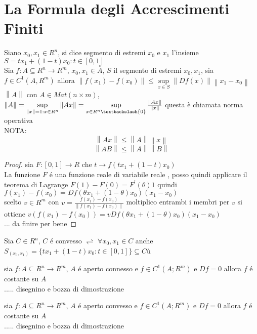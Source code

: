 \section{La Formula degli Accrescimenti Finiti}
Siano $x_0,x_1\in R^n$, si dice segmento di estremi $x_0$ e $x_1$ l'insieme $S={tx_1+(1-t)x_0 : t\in[0,1]}$
\\
Sia $f:A\subseteq R^n\rightarrow R^m$, $x_0,x_1\in\overset{\circ}{A}$, $S$ il segmento di estremi $x_0,x_1$, sia $f\in C^1(A,R^m)$ allora $\left\| f(x_1)-f(x_0) \right\|\le \sup\limits_{x\in S}\left\|Df(x)\right\|\left\|x_1-x_0\right\|$
\observation
$\left\| A \right\|$ con $A\in Mat(n\times m)$,  $\left\| A \right\|=\sup\limits_{\left\| x \right\|=1: x\in R^n}\left\| Ax \right\| = \sup\limits_{x\in R^n \textbackslash \{0\}}\frac{\left\| Ax \right\| }{\left\| x \right\| } $ questa è chiamata norma operativa\\
NOTA:\\
$$\left\| Ax \right\| \le \left\| A \right\| \left\| x \right\|  $$
$$\left\| AB \right\| \le \left\| A \right\| \left\| B \right\|  $$
\begin{proof}
	sia $F:[0,1]\rightarrow R$ che $t\rightarrow f(tx_1+(1-t)x_0)$\\
	La funzione $F$ \'e una funzione reale di variabile reale , posso quindi applicare il teorema di Lagrange $F(1)-F(0)=F^{'}(\theta)1$ quindi $f(x_1)-f(x_0) = Df(\theta x_1 + (1-\theta)x_0)(x_1-x_0)$\\
	scelto $v\in R^m$ con $v = \frac{f(x_1)-f(x_0)}{\left\| f(x_1)-f(x_0)\right\| }$ moltiplico entrambi i membri per $v$ si ottiene $v(f(x_1)-f(x_0)) = vDf(\theta x_1 + (1-\theta)x_0)(x_1-x_0)$\\
	... da finire per bene
\end{proof}
Sia $C\in R^n$, $C$ \'e convesso $\rightleftharpoons$ $\forall x_0,x_1\in C$ anche $S_(x_0,x_1) = \{tx_1+(1-t)x_0 : t\in[0,1]\}\subseteq C$ù

\proposition
sia $f:A\subseteq R^n \rightarrow R^m$, $A$ \'e aperto connesso e $f\in C^1(A;R^m)$ e $Df=0$ allora $f$ \'e costante su $A$\\
..... disegnino e bozza di dimostrazione

\proposition
sia $f:A\subseteq R^n \rightarrow R^m$, $A$ \'e aperto convesso e $f\in C^1(A;R^m)$ e $Df=0$ allora $f$ \'e costante su $A$\\
..... disegnino e bozza di dimostrazione


